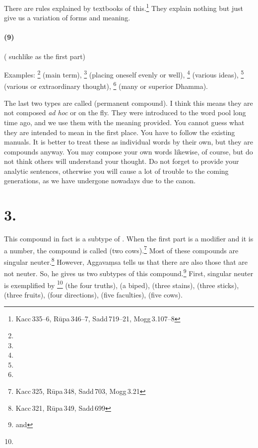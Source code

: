 There are rules explained by textbooks of this.\footnote{Kacc\,335--6, R\=upa\,346--7, Sadd\,719--21, Mogg\,3.107--8} They explain nothing but just give us a variation of forms and meaning.

\paragraph*{(9) } ( suchlike  as the first part)\par
Examples: \footnote{} (main term), \footnote{} (placing oneself evenly or well), \footnote{} (various ideas), \footnote{} (various or extraordinary thought), \footnote{} (many or superior Dhamma).

The last two types are called  (permanent compound). I think this means they are not composed \textit{ad hoc} or on the fly. They were introduced to the word pool long time ago, and we use them with the meaning provided. You cannot guess what they are intended to mean in the first place. You have to follow the existing manuals. It is better to treat these as individual words by their own, but they are compounds anyway. You may compose your own words likewise, of course, but do not think others will understand your thought. Do not forget to provide your analytic sentences, otherwise you will cause a lot of trouble to the coming generations, as we have undergone nowadays due to the canon.

\section*{3. }\label{sec:digu}

This compound in fact is a subtype of . When the first part is a modifier and it is a number, the compound is called  (two cows).\footnote{Kacc\,325, R\=upa\,348, Sadd\,703, Mogg\,3.21} Most of these compounds are singular neuter.\footnote{Kacc\,321, R\=upa\,349, Sadd\,699} However, Aggava\d msa tells us that there are also those that are not neuter. So, he gives us two subtypes of this compound.\footnote{ and } First, singular neuter  is exemplified by \footnote{} (the four truths),  (a biped),  (three stains),  (three sticks),  (three fruits),  (four directions),  (five faculties),  (five cows).

